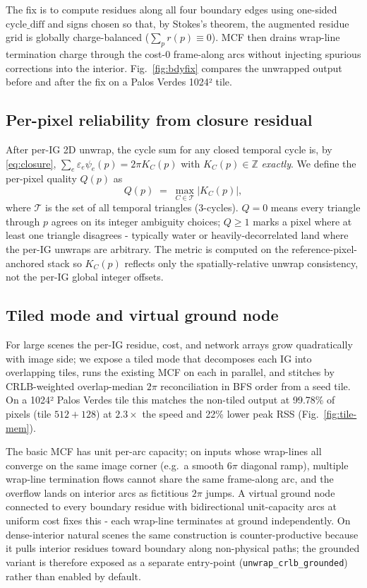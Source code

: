 \documentclass[journal]{IEEEtran}
\begin{document}
The fix is to compute residues along all four boundary edges using
one-sided $\mathrm{cycle\_diff}$ and signs chosen so that, by Stokes's
theorem, the augmented residue grid is globally charge-balanced
($\sum_p r(p)\equiv 0$). MCF then drains wrap-line termination charge
through the cost-0 frame-along arcs without injecting spurious
corrections into the interior. Fig.~\ref{fig:bdyfix} compares the
unwrapped output before and after the fix on a Palos Verdes 1024²
tile.

\subsection{Per-pixel reliability from closure residual}\label{sec:quality}

After per-IG 2D unwrap, the cycle sum for any closed temporal cycle is,
by \eqref{eq:closure},
$\sum_e\varepsilon_e\psi_e(p) = 2\pi K_C(p)$ with $K_C(p)\in\mathbb{Z}$
\emph{exactly}. We define the per-pixel quality $Q(p)$ as
\begin{equation}
Q(p) \;=\; \max_{C\in\mathcal{T}}|K_C(p)|,
\end{equation}
where $\mathcal{T}$ is the set of all temporal triangles
(3-cycles). $Q=0$ means every triangle through $p$ agrees on its
integer ambiguity choices; $Q\geq 1$ marks a pixel where at least one
triangle disagrees - typically water or heavily-decorrelated land where
the per-IG unwraps are arbitrary. The metric is computed on the
reference-pixel-anchored stack so $K_C(p)$ reflects only the
spatially-relative unwrap consistency, not the per-IG global integer
offsets.

\subsection{Tiled mode and virtual ground node}\label{sec:tile-ground}

For large scenes the per-IG residue, cost, and network arrays grow
quadratically with image side; we expose a tiled mode that decomposes
each IG into overlapping tiles, runs the existing MCF on each in
parallel, and stitches by CRLB-weighted overlap-median $2\pi$
reconciliation in BFS order from a seed tile. On a 1024² Palos Verdes
tile this matches the non-tiled output at 99.78\% of pixels (tile
$512+128$) at $2.3\times$ the speed and 22\% lower peak RSS
(Fig.~\ref{fig:tile-mem}).

The basic MCF has unit per-arc capacity; on inputs whose wrap-lines all
converge on the same image corner (e.g.\ a smooth 6$\pi$ diagonal
ramp), multiple wrap-line termination flows cannot share the same
frame-along arc, and the overflow lands on interior arcs as
fictitious $2\pi$ jumps. A virtual ground node connected to every
boundary residue with bidirectional unit-capacity arcs at uniform cost
fixes this - each wrap-line terminates at ground independently. On
dense-interior natural scenes the same construction is counter-productive
because it pulls interior residues toward boundary along non-physical
paths; the grounded variant is therefore exposed as a separate
entry-point (\texttt{unwrap\_crlb\_grounded}) rather than enabled by
default.
\end{document}
